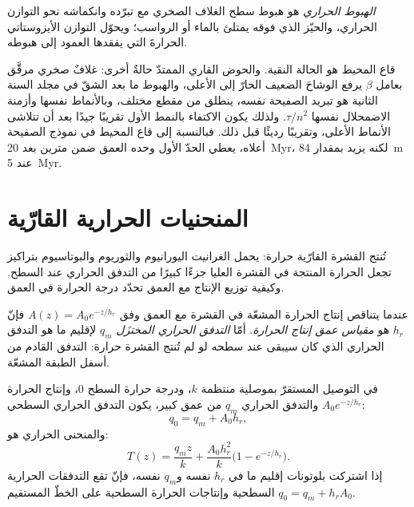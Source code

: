 \begin{definition}\label{def:b3:lithosphere-thermal-models:thermal-subsidence}
\emph{الهبوط الحراري} هو هبوط سطح
الغلاف الصخري مع تبرّده وانكماشه نحو التوازن الحراري، والحيّز الذي فوقه
يمتلئ بالماء أو الرواسب؛ ويحوّل التوازن الأيزوستاتي
الحرارةَ التي يفقدها العمود إلى هبوطه.
\end{definition}

قاع المحيط هو الحالة النقية. والحوض القاري الممتدّ حالةٌ أخرى: غلافٌ صخري
مرقَّق بعامل $\beta$ يرفع الوشاحَ الضعيف الحارّ إلى الأعلى،
والهبوط ما بعد الشقّ في مجلد السنة الثانية هو تبريد الصفيحة نفسه، ينطلق من
مقطع مختلف، وبالأنماط نفسها وأزمنة الاضمحلال نفسها $\tau/n^2$.
ولذلك يكون الاكتفاء بالنمط الأول تقريبًا جيدًا بعد أن تتلاشى الأنماط الأعلى،
وتقريبًا رديئًا قبل ذلك. فبالنسبة إلى قاع المحيط في نموذج الصفيحة أعلاه،
يعطي الحدّ الأول وحده العمق ضمن مترين بعد
\qty{20}{Myr}، لكنه يزيد بمقدار \qty{84}{m} عند \qty{5}{Myr}.

\section{المنحنيات الحرارية القارّية}

تُنتج القشرة القارّية حرارة: يحمل الغرانيت اليورانيوم والثوريوم والبوتاسيوم بتراكيز
تجعل الحرارة المنتجة في القشرة العليا جزءًا كبيرًا من
التدفق الحراري عند السطح. وكيفية توزيع الإنتاج مع العمق
تحدّد درجة الحرارة في العمق.

\begin{definition}\label{def:b3:lithosphere-thermal-models:reduced}
عندما يتناقص إنتاج الحرارة المشعّة في القشرة مع العمق وفق
$A(z) = A_0e^{-z/h_r}$ فإنّ $h_r$ هو \emph{مقياس عمق إنتاج
الحرارة}. أمّا \emph{التدفق الحراري
المختزَل} $q_m$ لإقليم ما هو التدفق الحراري الذي كان
سيبقى عند سطحه لو لم تُنتج القشرة حرارة:
التدفق القادم من أسفل الطبقة المشعّة.
\end{definition}

\begin{proposition}\label{prop:b3:lithosphere-thermal-models:exponential}
في التوصيل المستقرّ بموصلية منتظمة $k$، ودرجة حرارة السطح $0$،
وإنتاج الحرارة $A_0e^{-z/h_r}$ والتدفق الحراري $q_m$ من عمق كبير،
يكون التدفق الحراري السطحي:
\[
  q_0 = q_m + A_0h_r,
\]
والمنحنى الحراري هو:
\[
  T(z) = \frac{q_mz}{k} + \frac{A_0h_r^2}{k}\bigl(1 - e^{-z/h_r}\bigr).
\]
إذا اشتركت بلوتونات إقليم ما في $h_r$ نفسه و$q_m$ نفسه، فإنّ
تقع التدفقات الحرارية السطحية وإنتاجات الحرارة السطحية على الخطّ المستقيم
$q_0 = q_m + h_rA_0$.
\end{proposition}

